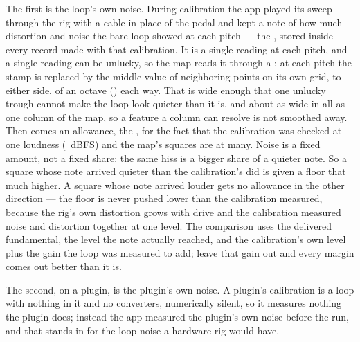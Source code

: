 \documentclass[11pt,a4paper]{article}
\begin{document}
The first is the loop's own noise. During calibration the app played its
sweep through the rig with a cable in place of the pedal and kept a note
of how much distortion and noise the bare loop showed at each pitch ---
the , stored inside every record made with that
calibration. It is a single reading at each pitch, and a single reading
can be unlucky, so the map reads it through a : at each
pitch the stamp is replaced by the middle value of \gmStampMedianPoints{}
neighboring points on its own grid, \gmStampMedianSide{} to either side,
\gmStampMedianOctavesWords{} of an octave (\journeyStampMedianOctaves{})
each way. That is wide enough that one unlucky trough cannot make the
loop look quieter than it is, and about as wide in all as one column of
the map, so a feature a column can resolve is not smoothed away. Then
comes an allowance, the , for the fact that the
calibration was checked at one loudness (\gmCalibrationLevelDBFS{}~dBFS)
and the map's squares are at many. Noise is a fixed amount, not a fixed
share: the same hiss is a bigger share of a quieter note. So a square
whose note arrived quieter than the calibration's did is given a floor
that much higher. A square whose note arrived louder gets no allowance in
the other direction --- the floor is never pushed lower than the
calibration measured, because the rig's own distortion grows with drive
and the calibration measured noise and distortion together at one level.
The comparison uses the delivered fundamental, the level the note
actually reached, and the calibration's own level plus the gain the loop
was measured to add; leave that gain out and every margin comes out
better than it is.

The second, on a plugin, is the plugin's own noise. A plugin's
calibration is a loop with nothing in it and no converters, numerically
silent, so it measures nothing the plugin does; instead the app measured
the plugin's own noise before the run, and that 
stands in for the loop noise a hardware rig would have.
\end{document}

